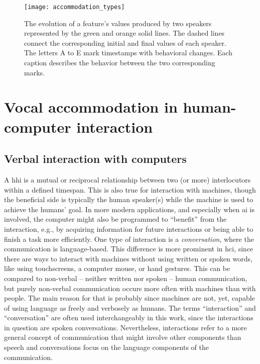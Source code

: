 \begin{figure}[t]
	\centering
	\texttt{[image: accommodation\_types]}
	\caption[Different accommodation types in a conversation]
		{The evolution of a feature's values produced by two speakers represented by the green and orange solid lines.
		The dashed lines connect the corresponding initial and final values of each speaker.
		The letters A to E mark timestamps with behavioral changes.
		Each caption describes the behavior between the two corresponding marks.}
	\label{fig:accommodation_types}
\end{figure}

\section{Vocal accommodation in human-computer interaction}
\label{sec:phonetic_convergence_in_hci}


\subsection{Verbal interaction with computers}
\label{subsec:verbal_interaction}

A \acf{hhi} is a mutual or reciprocal relationship between two (or more) interlocutors within a defined timespan.
This is also true for interaction with machines, though the beneficial side is typically the human speaker(s) while the machine is used to achieve the humans' goal.
In more modern applications, and especially when \ac{ai} is involved, the computer might also be programmed to \enquote{benefit} from the interaction, e.g., by acquiring information for future interactions or being able to finish a task more efficiently.
One type of interaction is a \emph{conversation}, where the communication is language-based.
This difference is more prominent in \ac{hci}, since there are ways to interact with machines without using written or spoken words, like using touchscreens, a computer mouse, or hand gestures.
This can be compared to non-verbal -- neither written nor spoken -- human communication, but purely non-verbal communication occurs more often with machines than with people.
The main reason for that is probably since machines are not, yet, capable of using language as freely and verbosely as humans.
The terms \enquote{interaction} and \enquote{conversation} are often used interchangeably in this work, since the interactions in question are spoken conversations.
Nevertheless, interactions refer to a more general concept of communication that might involve other components than speech and conversations focus on the language components of the communication.


